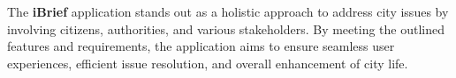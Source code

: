 The \textbf{iBrief} application stands out as a holistic approach to address city issues by involving citizens, authorities, and various stakeholders. By meeting the outlined features and requirements, the application aims to ensure seamless user experiences, efficient issue resolution, and overall enhancement of city life.
